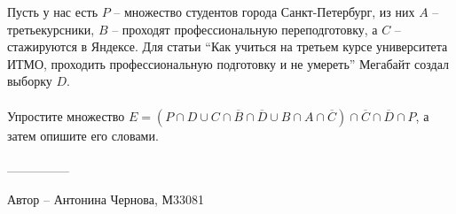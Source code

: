 \question
Пусть у нас есть $P$ -- множество студентов города Санкт-Петербург, из них $A$ -- третьекурсники, $B$ -- проходят профессиональную переподготовку, а $C$ -- стажируются в Яндексе. Для статьи “Как учиться на третьем курсе университета ИТМО, проходить профессиональную подготовку и не умереть” Мегабайт создал выборку $D$.
\\
\\
Упростите множество $E = (P \cap D \cup C \cap \overline{B} \cap \overline{D} \cup B \cap A \cap \overline{C}) \cap \overline{C} \cap \overline{D} \cap P$, а затем опишите его словами.
\\
\\
---------------

Автор -- Антонина Чернова, М33081